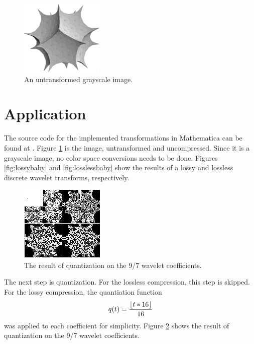 \documentclass[titlepage,12pt]{article}
\DeclarePairedDelimiter\floor{\lfloor}{\rfloor}
\begin{document}
\begin{figure}
	\centering
	\includegraphics{resources/baby.png}
	\caption{An untransformed grayscale image.}
	\label{fig:original}
\end{figure}


\section{Application}

The source code for the implemented transformations in Mathematica can be found at \cite{implement}.
Figure \ref{fig:original} is the image, untransformed and uncompressed.
Since it is a grayscale image, no color space conversions needs to be done.
Figures \ref{fig:lossybaby} and \ref{fig:losslessbaby} show the results of a lossy and lossless 
discrete wavelet transforms, respectively.

\begin{figure}
	\centering
	\includegraphics{resources/quantBabyPlot.png}
	\caption{The result of quantization on the 9/7 wavelet coefficients.}
	\label{fig:quantBabyPlot}
\end{figure}

The next step is quantization.
For the lossless compression, this step is skipped.
For the lossy compression, the quantiation function
\[q(t)=\frac{\floor{t*16}}{16}\]
was applied to each coefficient for simplicity.
Figure \ref{fig:quantBabyPlot} shows the result of quantization on the 9/7 wavelet coefficients.
\end{document}
